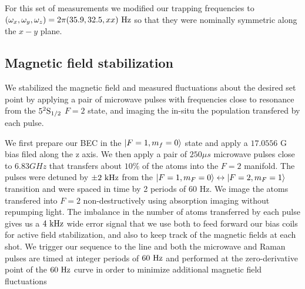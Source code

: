 For this set of measurements we modified our trapping frequencies to $(\omega_x, \omega_y, \omega_z)=2\pi(35.9, 32.5, xx) {\ {\rm Hz}}$  so that they were nominally symmetric along the $x-y$ plane. 

\subsection{Magnetic field stabilization}
We stabilized the magnetic field and measured fluctuations about the desired set point by applying a pair of microwave pulses with frequencies close to resonance from the $5^2{\rm S}_{1/2}$ $F=2$ state, and imaging the in-situ the population transfered by each pulse. 

We first prepare our BEC in the $|F=1, m_f=0\rangle$ state and apply a $17.0556$ G bias filed along the z axis. We then apply a pair of $250\mu s$ microwave pulses close to $6.83 GHz$ that transfers about $10\%$ of the atoms into the $F=2$ manifold. The pulses were detuned by $\pm 2{\ {\rm kHz}}$ from the $|F=1,m_F=0\rangle\leftrightarrow|F=2,m_F=1\rangle$ transition and were spaced in time by 2 periods of 60 Hz. We image the atoms transfered into $F=2$ non-destructively using absorption imaging without repumping light. The imbalance in the number of atoms transferred by each pulse gives us a $4{\ {\rm kHz}}$ wide error signal that we use both to feed forward our bias coils for active field stabilization, and also to keep track of the magnetic fields at each shot. We trigger our sequence to the line and both the microwave and Raman pulses are timed at integer periods of $60{\ {\rm Hz}}$ and performed at the zero-derivative point of the $60{\ {\rm Hz}}$ curve in order to minimize additional magnetic field fluctuations

